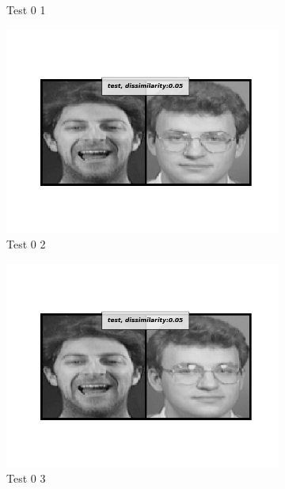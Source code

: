 \documentclass[12pt]{article}
\begin{document}
\begin{figure}[htbp]
\begin{subfigure}[t]{0.48\textwidth}
        \caption{Test 0 1}
    \label{hw3p3b}
    \end{subfigure}
    \begin{subfigure}[t]{0.48\textwidth}
        \centering
        \includegraphics[scale=0.5,trim={1in 1in 1in 1in},clip]{./Homework3/output/siamese/test_0_2.png}
        \caption{Test 0 2}
    \label{hw3p3c}
    \end{subfigure}
    \begin{subfigure}[t]{0.48\textwidth}
        \centering
        \includegraphics[scale=0.5,trim={1in 1in 1in 1in},clip]{./Homework3/output/siamese/test_0_3.png}
        \caption{Test 0 3}
    \label{hw3p3d}
    \end{subfigure}
    \begin{subfigure}[t]{0.48\textwidth}

\end{subfigure}
\end{figure}
\end{document}
